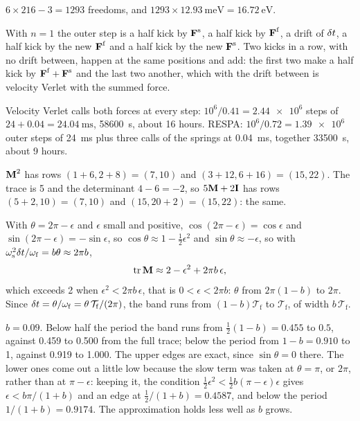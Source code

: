 $6\times216 - 3 = 1293$ freedoms, and $1293\times
\SI{12.93}{\milli\electronvolt} = \SI{16.72}{\electronvolt}$.

With $n = 1$ the outer step is a half kick
by $\bm{\mathrm{F}}^{\mathrm s}$, a half kick by $\bm{\mathrm{F}}^{\mathrm f}$, a drift of
$\delta t$, a half kick by the new $\bm{\mathrm{F}}^{\mathrm f}$ and a half kick by the
new $\bm{\mathrm{F}}^{\mathrm s}$. Two kicks in a row, with no drift between,
happen at the same positions and add: the first two make a half kick by
$\bm{\mathrm{F}}^{\mathrm f} + \bm{\mathrm{F}}^{\mathrm s}$ and the last two another, which
with the drift between is velocity Verlet with the summed force.

Velocity Verlet calls both forces at every step:
$10^6/0.41 = \num{2.44e6}$ steps of $24 + 0.04 =
\SI{24.04}{\milli\second}$, \SI{58600}{\second}, about 16 hours. RESPA:
$10^6/0.72 = \num{1.39e6}$ outer steps of \SI{24}{\milli\second} plus
three calls of the springs at \SI{0.04}{\milli\second}, together
\SI{33500}{\second}, about 9 hours.

$\bm{\mathrm{M}}^2$ has rows $(1 + 6, 2 + 8) = (7, 10)$
and $(3 + 12, 6 + 16) = (15, 22)$. The trace is 5 and the determinant
$4 - 6 = -2$, so $5\bm{\mathrm{M}} + 2\bm{\mathrm{I}}$ has rows $(5 + 2, 10) = (7, 10)$ and
$(15, 20 + 2) = (15, 22)$: the same.

With $\theta = 2\pi - \epsilon$ and $\epsilon$
small and positive, $\cos(2\pi - \epsilon) = \cos\epsilon$ and
$\sin(2\pi - \epsilon) = -\sin\epsilon$, so $\cos\theta \approx 1 -
\frac12\epsilon^2$ and $\sin\theta \approx -\epsilon$, so with $\omega_{\mathrm s}^2\delta t/\omega_{\mathrm f} =
b\theta \approx 2\pi b$,
\begin{equation*}
   \operatorname{tr}\bm{\mathrm{M}} \approx 2 - \epsilon^2 + 2\pi b\,\epsilon ,
\end{equation*}
which exceeds 2 when $\epsilon^2 < 2\pi b\,\epsilon$, that is $0 <
\epsilon < 2\pi b$: $\theta$ from $2\pi(1 - b)$ to $2\pi$. Since $\delta t =
\theta/\omega_{\mathrm f} = \theta\,\mathcal{T}_{\mathrm f}/(2\pi)$, the
band runs from $(1 - b)\mathcal{T}_{\mathrm f}$ to $\mathcal{T}_{\mathrm
f}$, of width $b\,\mathcal{T}_{\mathrm f}$.

$b = 0.09$. Below half the period the band runs
from $\frac12(1 - b) = 0.455$ to $0.5$, against 0.459 to 0.500 from the
full trace; below the period from $1 - b = 0.910$ to 1, against 0.919 to
1.000. The upper edges are exact, since $\sin\theta = 0$ there. The lower
ones come out a little low because the slow term was taken at $\theta =
\pi$, or $2\pi$, rather than at $\pi - \epsilon$: keeping it, the
condition $\frac12\epsilon^2 < \frac12b(\pi - \epsilon)\epsilon$ gives
$\epsilon < b\pi/(1 + b)$ and an edge at $\frac12/(1 + b) = 0.4587$, and
below the period $1/(1 + b) = 0.9174$. The approximation holds less well
as $b$ grows.

